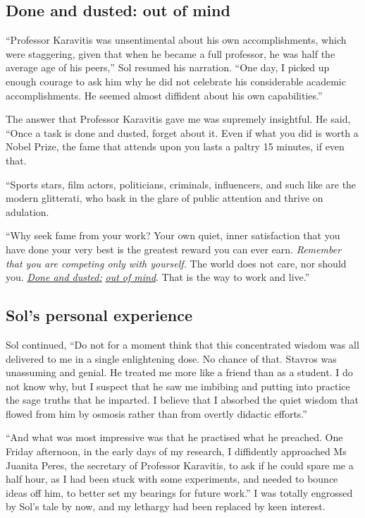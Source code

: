 \documentclass[
  a4paper,
]{article}
\begin{document}
\subsection{Done and dusted: out of
mind}\label{done-and-dusted-out-of-mind}

``Professor Karavitis was unsentimental about his own accomplishments,
which were staggering, given that when he became a full professor, he
was half the average age of his peers,'' Sol resumed his narration.
``One day, I picked up enough courage to ask him why he did not
celebrate his considerable academic accomplishments. He seemed almost
diffident about his own capabilities.''

The answer that Professor Karavitis gave me was supremely insightful. He
said, ``Once a task is done and dusted, forget about it. Even if what
you did is worth a Nobel Prize, the fame that attends upon you lasts a
paltry 15 minutes, if even that.

``Sports stars, film actors, politicians, criminals, influencers, and
such like are the modern glitterati, who bask in the glare of public
attention and thrive on adulation.

``Why seek fame from your work? Your own quiet, inner satisfaction that
you have done your very best is the greatest reward you can ever earn.
\emph{Remember that you are competing only with yourself.} The world
does not care, nor should you.
\href{https://www.macmillandictionary.com/dictionary/british/be-done-and-dusted}{\emph{Done
and dusted:}}
\href{https://www.merriam-webster.com/dictionary/out\%20of\%20mind}{\emph{out
of mind}}. That is the way to work and live.''

\subsection{Sol's personal experience}\label{sols-personal-experience}

Sol continued, ``Do not for a moment think that this concentrated wisdom
was all delivered to me in a single enlightening dose. No chance of
that. Stavros was unassuming and genial. He treated me more like a
friend than as a student. I do not know why, but I suspect that he saw
me imbibing and putting into practice the sage truths that he imparted.
I believe that I absorbed the quiet wisdom that flowed from him by
osmosis rather than from overtly didactic efforts.''

``And what was most impressive was that he practised what he preached.
One Friday afternoon, in the early days of my research, I diffidently
approached Ms Juanita Peres, the secretary of Professor Karavitis, to
ask if he could spare me a half hour, as I had been stuck with some
experiments, and needed to bounce ideas off him, to better set my
bearings for future work.'' I was totally engrossed by Sol's tale by
now, and my lethargy had been replaced by keen interest.
\end{document}
